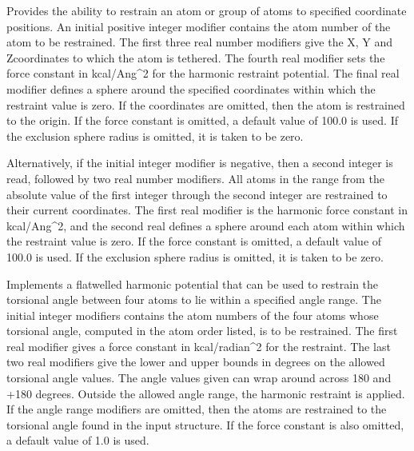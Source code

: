 \documentclass[letterpaper,11pt,english]{sphinxmanual}
\begin{document}
\ignorespaces {}\label{\detokenize{text/keywords:key-restrain-position}}\begin{description}
\sphinxAtStartPar
Provides the ability to restrain an atom or group of atoms to specified coordinate positions. An initial positive integer modifier contains the atom number of the atom to be restrained. The first three real number modifiers give the X\sphinxhyphen{}, Y\sphinxhyphen{} and Z\sphinxhyphen{}coordinates to which the atom is tethered. The fourth real modifier sets the force constant in kcal/Ang\textasciicircum{}2 for the harmonic restraint potential. The final real modifier defines a sphere around the specified coordinates within which the restraint value is zero. If the coordinates are omitted, then the atom is restrained to the origin. If the force constant is omitted, a default value of 100.0 is used. If the exclusion sphere radius is omitted, it is taken to be zero.

\sphinxAtStartPar
Alternatively, if the initial integer modifier is negative, then a second integer is read, followed by two real number modifiers. All atoms in the range from the absolute value of the first integer through the second integer are restrained to their current coordinates. The first real modifier is the harmonic force constant in kcal/Ang\textasciicircum{}2, and the second real defines a sphere around each atom within which the restraint value is zero. If the force constant is omitted, a default value of 100.0 is used. If the exclusion sphere radius is omitted, it is taken to be zero.

\end{description}

\ignorespaces {}\label{\detokenize{text/keywords:key-restrain-torsion}}\begin{description}
\sphinxAtStartPar
Implements a flat\sphinxhyphen{}welled harmonic potential that can be used to restrain the torsional angle between four atoms to lie within a specified angle range. The initial integer modifiers contains the atom numbers of the four atoms whose torsional angle, computed in the atom order listed, is to be restrained. The first real modifier gives a force constant in kcal/radian\textasciicircum{}2 for the restraint. The last two real modifiers give the lower and upper bounds in degrees on the allowed torsional angle values. The angle values given can wrap around across \sphinxhyphen{}180 and +180 degrees. Outside the allowed angle range, the harmonic restraint is applied. If the angle range modifiers are omitted, then the atoms are restrained to the torsional angle found in the input structure. If the force constant is also omitted, a default value of 1.0 is used.

\end{description}
\end{document}
